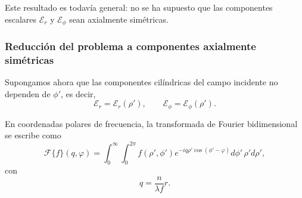 Este resultado es todavía general: no se ha supuesto que las componentes escalares $\mathscr E_r$ y $\mathscr E_\phi$ sean axialmente simétricas.

\subsubsection{Reducción del problema a componentes axialmente simétricas}

Supongamos ahora que las componentes cilíndricas del campo incidente no dependen de $\phi'$, es decir,
\begin{equation}
  \mathscr E_r=\mathscr E_r(\rho'),
  \qquad
  \mathscr E_\phi=\mathscr E_\phi(\rho').
\end{equation}

En coordenadas polares de frecuencia, la transformada de Fourier bidimensional se escribe como
\begin{equation}
  \mathscr F\{f\}(q,\varphi)
  =
  \int_0^\infty
  \int_0^{2\pi}
  f(\rho',\phi')
  e^{-iq\rho'\cos(\phi'-\varphi)}
  d\phi'\,\rho' d\rho',
  \label{eq:fourier_polar_cylindrical}
\end{equation}
con
\begin{equation}
  q=\frac{n}{\lambda f}r.
\end{equation}

